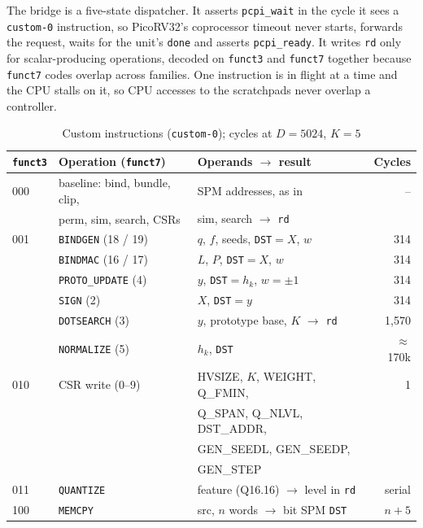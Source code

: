 \documentclass[conference]{IEEEtran}
\begin{document}
The bridge is a five-state dispatcher. It asserts \texttt{pcpi\_wait} in the cycle it sees a \texttt{custom-0} instruction, so PicoRV32's coprocessor timeout never starts, forwards the request, waits for the unit's \texttt{done} and asserts \texttt{pcpi\_ready}. It writes \texttt{rd} only for scalar-producing operations, decoded on \texttt{funct3} and \texttt{funct7} together because \texttt{funct7} codes overlap across families. One instruction is in flight at a time and the CPU stalls on it, so CPU accesses to the scratchpads never overlap a controller.

\begin{table}[t]
\caption{Custom instructions (\texttt{custom-0}); cycles at $D{=}5024$, $K{=}5$}
\label{tab:isa}
\centering\scriptsize
\setlength{\tabcolsep}{3pt}
\begin{tabular}{@{}lllr@{}}
\toprule
\texttt{funct3} & Operation (\texttt{funct7}) & Operands $\rightarrow$ result & Cycles \\
\midrule
000 & baseline: bind, bundle, clip, & SPM addresses, as in~\cite{martino2026} & -- \\
    & perm, sim, search, CSRs & sim, search $\rightarrow$ \texttt{rd} & \\
\midrule
001 & \texttt{BINDGEN} (18 / 19) & $q$, $f$, seeds, \texttt{DST}$=X$, $w$ & 314 \\
    & \texttt{BINDMAC} (16 / 17) & $L$, $P$, \texttt{DST}$=X$, $w$ & 314 \\
    & \texttt{PROTO\_UPDATE} (4) & $y$, \texttt{DST}$=h_k$, $w{=}\pm1$ & 314 \\
    & \texttt{SIGN} (2) & $X$, \texttt{DST}$=y$ & 314 \\
    & \texttt{DOTSEARCH} (3) & $y$, prototype base, $K$ $\rightarrow$ \texttt{rd} & 1,570 \\
    & \texttt{NORMALIZE} (5) & $h_k$, \texttt{DST} & $\approx$170k \\
\midrule
010 & CSR write (0--9) & HVSIZE, $K$, WEIGHT, Q\_FMIN, & 1 \\
    & & Q\_SPAN, Q\_NLVL, DST\_ADDR, & \\
    & & GEN\_SEEDL, GEN\_SEEDP, & \\
    & & GEN\_STEP & \\
\midrule
011 & \texttt{QUANTIZE} & feature (Q16.16) $\rightarrow$ level in \texttt{rd} & serial \\
\midrule
100 & \texttt{MEMCPY} & src, $n$ words $\rightarrow$ bit SPM \texttt{DST} & $n{+}5$ \\
\bottomrule
\end{tabular}
\end{table}
\end{document}

